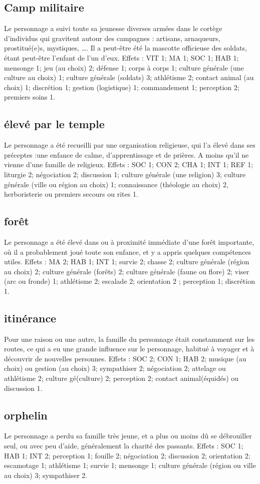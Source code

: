 \documentclass[10pt,a4paper,twocolumn]{book}
\begin{document}
\subsection*{Camp militaire}
Le personnage a suivi toute sa jeunesse diverses armées dans le cortège d’individus qui gravitent autour des campagnes : artisans, arnaqueurs, prostitué(e)s, mystiques, …. Il a peut-être été la mascotte officieuse des soldats, étant peut-être l’enfant de l’un d’eux.
Effets : VIT 1; MA 1; SOC 1; HAB 1; mensonge 1; jeu (au choix) 2; défense 1; corps à corps 1; culture générale (une culture au choix) 1; culture générale (soldats) 3;  athlétisme 2; contact animal (au choix) 1; discrétion 1; gestion (logistique) 1; commandement 1; perception 2; premiers soins 1.
\subsection*{élevé par le temple}
Le personnage a été recueilli par une organisation religieuse, qui l’a élevé dans ses préceptes :une enfance de calme, d’apprentissage et de prières. A moins qu’il ne vienne d’une famille de religieux.
Effets : SOC 1; CON 2; CHA 1; INT 1; REF 1; liturgie 2; négociation 2; discussion 1; culture générale (une religion) 3; culture générale (ville ou région au choix) 1; connaissance (théologie au choix) 2, herboristerie ou premiers secours ou rites 1.
\subsection*{forêt}
Le personnage a été élevé dans ou à proximité immédiate d’une forêt importante, où il a probablement joué toute son enfance, et y a appris quelques compétences utiles.
Effets  : MA 2; HAB 1; INT 1; survie 2; chasse 2; culture générale (région au choix) 2; culture générale (forêts) 2; culture générale (faune ou flore) 2; viser (arc ou fronde) 1; athlétisme 2; escalade 2; orientation 2 ; perception 1; discrétion 1.
\subsection*{itinérance}
Pour une raison ou une autre, la famille du personnage était constamment sur les routes, ce qui a eu une grande influence sur le personnage, habitué à voyager et à découvrir de nouvelles personnes.
Effets : SOC 2; CON 1; HAB 2; musique (au choix) ou gestion (au choix) 3; sympathiser 2; négociation 2; attelage ou athlétisme 2; culture gé(culture) 2; perception 2; contact animal(équidés) ou discussion 1.
\subsection*{orphelin}
Le personnage a perdu sa famille très jeune, et a plus ou moins dû se débrouiller seul, ou avec peu d’aide, généralement la charité des passants.
Effets : SOC 1; HAB 1; INT 2; perception 1; fouille 2; négociation 2; discussion 2; orientation 2; escamotage 1; athlétisme 1; survie 1; mensonge 1; culture générale (région ou ville au choix) 3; sympathiser 2.
\end{document}
